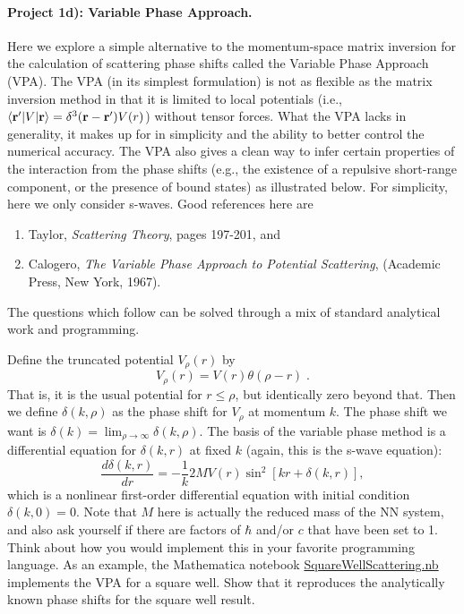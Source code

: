 \documentclass[%
oneside,                 %
final,                   %
10pt]{article}
\begin{document}
\paragraph{Project 1d): Variable Phase Approach.}
Here we explore a simple alternative to the momentum-space matrix inversion for the
calculation of scattering phase shifts called the Variable Phase Approach (VPA). The VPA (in 
its simplest formulation) is not as flexible as the matrix inversion method in that it is limited
to local potentials (i.e., $\langle{\bf r'}|V|{\bf r}\rangle = \delta^3({\bf r}-{\bf r'})V(r)$) 
without tensor forces. What the VPA lacks in
generality, it makes up for in simplicity and the ability to better control the numerical accuracy. The VPA also gives a clean way to infer certain properties of the interaction from the phase shifts (e.g., the existence of a repulsive short-range component, or the presence of bound states) as illustrated below.
For simplicity, here we only consider s-waves. Good references here are
\begin{enumerate}
\item Taylor, \emph{Scattering Theory}, pages 197-201, and

\item Calogero, \emph{The Variable Phase Approach to Potential Scattering}, (Academic Press, New York, 1967).  
\end{enumerate}

\noindent
The questions which follow can be solved through a mix of standard analytical work and programming.

Define the truncated potential $V_\rho(r)$ by
\[
   V_\rho(r) = V(r) \theta(\rho-r) \;.
\]
That is, it is the usual potential for $r \leq \rho$, but identically
zero beyond that.  Then we define $\delta(k,\rho)$ as the phase shift
for $V_\rho$ at momentum $k$.  The phase shift we want is
$\delta(k) = \lim_{\rho\rightarrow\infty} \delta(k,\rho)$.  The basis
of the variable phase method is a differential equation for $\delta(k,r)$
at fixed $k$ (again, this is the s-wave equation):
\[
\frac{d\delta(k,r)}{dr} = -\frac{1}{k} 2M V(r) \sin^2[kr + \delta(k,r)],
\]
which is a nonlinear first-order differential equation with initial
condition $\delta(k,0) = 0$.  Note that $M$ here is actually the reduced mass of the NN system, and also ask yourself if there are factors of $\hbar$ and/or $c$ that have been set to 1. Think about how you would implement
this in your favorite programming language.  
As an example, the Mathematica notebook \href{{https://github.com/ManyBodyPhysics/NuclearForces/tree/master/doc/Projects/2017/Project1}}{SquareWellScattering.nb} implements
the VPA for a square well.   Show that it reproduces the analytically known phase shifts for the square well result. 
\end{document}
